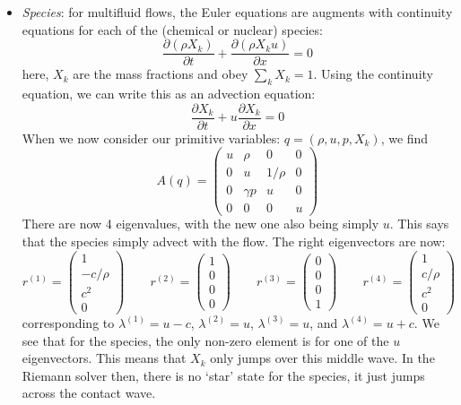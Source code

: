 \begin{itemize}
\item {\em Species}: for multifluid flows, the Euler equations are
augments with continuity equations for each of the (chemical or nuclear)
species:
\begin{equation}
\frac{\partial (\rho X_k)}{\partial t} + \frac{\partial (\rho X_k u)}{\partial x} = 0
\end{equation}
here, $X_k$ are the mass fractions and obey $\sum_k X_k = 1$.  Using the
continuity equation, we can write this as an advection equation:
\begin{equation}
\frac{\partial X_k}{\partial t} + u \frac{\partial X_k}{\partial x} = 0
\end{equation}
When we now consider our primitive variables: $q = (\rho, u, p, X_k)$,
we find
\begin{equation}
A(q) = \left ( \begin{array}{cccc} u  & \rho     & 0      &  0\\
                                  0  &  u       & 1/\rho &  0\\
                                  0  & \gamma p & u      &  0\\
                                  0  & 0        & 0      & u \end{array} \right )
\end{equation}
There are now 4 eigenvalues, with the new one also being simply $u$.
This says that the species simply advect with the flow.  The right
eigenvectors are now:
\begin{equation}
r^{(1)} = \left ( \begin{array}{c} 1 \\ -c/\rho \\ c^2 \\ 0\end{array} \right )
%
\qquad
r^{(2)} = \left ( \begin{array}{c} 1 \\ 0 \\ 0  \\ 0\end{array} \right )
%
\qquad
r^{(3)} = \left ( \begin{array}{c} 0 \\ 0  \\ 0 \\ 1 \end{array} \right )
%
\qquad
r^{(4)} = \left ( \begin{array}{c} 1 \\ c/\rho \\ c^2 \\ 0 \end{array} \right )
\end{equation}
corresponding to $\lambda^{(1)} = u -c$, $\lambda^{(2)} = u$,
$\lambda^{(3)} = u$, and $\lambda^{(4)} = u + c$.  We see that for the
species, the only non-zero element is for one of the $u$ eigenvectors.
This means that $X_k$ only jumps over this middle wave.  In the
Riemann solver then, there is no `star' state for the species, it just
jumps across the contact wave.


\end{itemize}

